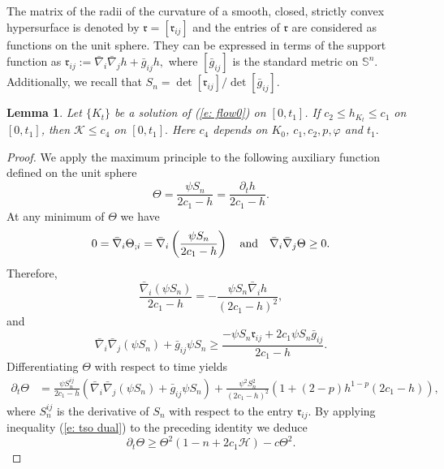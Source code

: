 \documentclass{amsart}
\newtheorem{lemma}[theorem]{Lemma}
\theoremstyle{definition}
\theoremstyle{remark}
\numberwithin{equation}{section}
\begin{document}
The matrix of the radii of the curvature of a smooth, closed, strictly convex hypersurface is denoted by $\mathfrak{r}=[\mathfrak{r}_{ij}]$ and the entries of $\mathfrak{r}$ are considered as functions on the unit sphere. They can be expressed in terms of the support function as $\mathfrak{r}_{ij}:=\bar{\nabla}_i\bar{\nabla}_j h+\bar{g}_{ij}h,$ where $[\bar{g}_{ij}]$ is the standard metric on $\mathbb{S}^{n}$. Additionally, we recall that
$S_n=\det [\mathfrak{r}_{ij}]/\det[\bar{g}_{ij}].$
\begin{lemma}\label{lem: lower}
Let $\{K_t\}$ be a solution of (\ref{e: flow0}) on $[0,t_1]$. If $c_2\leq h_{K_t}\leq c_1$ on $[0,t_1]$, then $\mathcal{K}\leq c_4$ on $[0,t_1].$ Here $c_4$ depends on $K_0$, $c_1,c_2,p,\varphi$ and $t_1.$
\end{lemma}
\begin{proof}
We apply the maximum principle to the following auxiliary function defined on the unit sphere
\[\Theta=\frac{\psi S_n}{2c_1-h}=\frac{\partial_t h}{2c_1-h}.\]
At any minimum of $\Theta$ we have
\[0=\bar{\nabla}_i\Theta_{;i}=\bar{\nabla}_i \left(\frac{\psi S_{n}}{2c_1-h}\right)\ \ \ {\hbox{and}}\ \ \  \bar{\nabla}_i\bar{\nabla}_j \Theta\geq 0.\]
Therefore,
\[ \frac{\bar{\nabla}_i (\psi S_{n})}{2c_1-h}=-\frac{\psi S_{n} \bar{\nabla}_i h}{(2c_1-h)^2}, \] and
\begin{equation}\label{e: tso dual}
\bar{\nabla}_i\bar{\nabla}_j (\psi S_{n})+\bar{g}_{ij} \psi S_{n}\geq
\frac{-\psi S_{n}\mathfrak{r}_{ij}+2c_1\psi S_{n}\bar{g}_{ij}}{2c_1-h}.
\end{equation}
Differentiating $\Theta$ with respect to time yields
\begin{align*}
\partial_t\Theta&=\frac{\psi S_n^{ij}}{2c_1-h}
\left(\bar{\nabla}_i\bar{\nabla}_j(\psi S_{n})+\bar{g}_{ij}\psi S_{n}\right)
+\frac{\psi^2S_n^{2}}{(2c_1-h)^2}\left(1+(2-p)h^{1-p}(2c_1-h)\right),
\end{align*}
 where $S_n^{ij}$ is the derivative of $S_n$ with respect to the entry $ \mathfrak{r}_{ij}$.
By applying inequality (\ref{e: tso dual}) to the preceding identity we deduce
\begin{equation}\label{e: last step tso dual}
\partial_t\Theta\geq \Theta^2\left(1-n+2 c_1\mathcal{H}\right)-c\Theta^2.
\end{equation}

\end{proof}
\end{document}
